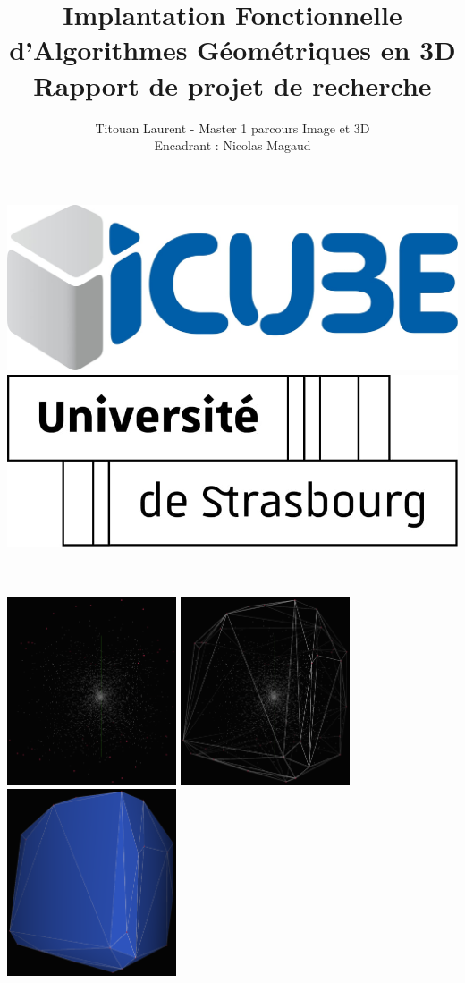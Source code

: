 \documentclass[]{article}
\title{Implantation Fonctionnelle \\ d'Algorithmes Géométriques en 3D \\[0.5cm]
  \large Rapport de projet de recherche}
\author{
	Titouan Laurent - Master 1 parcours Image et 3D\\
	Encadrant : Nicolas Magaud
}
\date{}
\begin{document}
\makeatletter
\begin{titlepage}
	\begin{center}
		\includegraphics[width=0.25\linewidth]{logos/icube.jpg}
		\includegraphics[width=0.3\linewidth]{logos/uds.jpg}\\[2cm]
		{\huge \bfseries  \@title }\\[1cm]
		{\large  \@author}\\[2cm]
		\begin{center}
			\includegraphics[width=5cm]{illus/illus0.png}
			\includegraphics[width=5cm]{illus/illus1.png}
			\includegraphics[width=5cm]{illus/illus2.png}
		\end{center}
	\end{center}
\end{titlepage}
\makeatother
\end{document}
